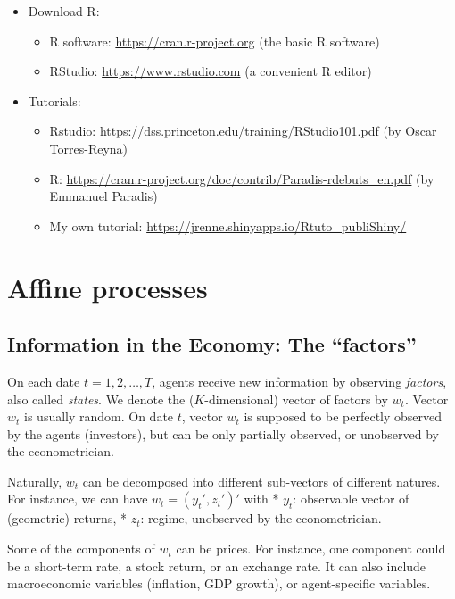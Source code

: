 \documentclass[
  12pt,
]{book}
\providecommand{\tightlist}{%
  \setlength{\itemsep}{0pt}\setlength{\parskip}{0pt}}
\theoremstyle{definition}
\theoremstyle{definition}
\theoremstyle{definition}
\theoremstyle{definition}
\theoremstyle{remark}
\begin{document}
\begin{itemize}
\item
  Download R:

  \begin{itemize}
  \tightlist
  \item
    R software: \url{https://cran.r-project.org} (the basic R software)
  \item
    RStudio: \url{https://www.rstudio.com} (a convenient R editor)
  \end{itemize}
\item
  Tutorials:

  \begin{itemize}
  \tightlist
  \item
    Rstudio: \url{https://dss.princeton.edu/training/RStudio101.pdf} (by Oscar Torres-Reyna)
  \item
    R: \url{https://cran.r-project.org/doc/contrib/Paradis-rdebuts_en.pdf} (by Emmanuel Paradis)
  \item
    My own tutorial: \url{https://jrenne.shinyapps.io/Rtuto_publiShiny/}
  \end{itemize}
\end{itemize}

\hypertarget{ChapterAffine}{%
\chapter{Affine processes}\label{ChapterAffine}}

\hypertarget{Information}{%
\section{Information in the Economy: The ``factors''}\label{Information}}

On each date \(t=1,2,\dots,T\), agents receive new information by observing \emph{factors}, also called \emph{states}. We denote the (\(K\)-dimensional) vector of factors by \(w_t\). Vector \(w_t\) is usually random. On date \(t\), vector \(w_t\) is supposed to be perfectly observed by the agents (investors), but can be only partially observed, or unobserved by the econometrician.

Naturally, \(w_t\) can be decomposed into different sub-vectors of different natures. For instance, we can have \(w_t = (y_t', z_t')'\) with
* \(y_t\): observable vector of (geometric) returns,
* \(z_t\): regime, unobserved by the econometrician.

Some of the components of \(w_t\) can be prices. For instance, one component could be a short-term rate, a stock return, or an exchange rate. It can also include macroeconomic variables (inflation, GDP growth), or agent-specific variables.
\end{document}
